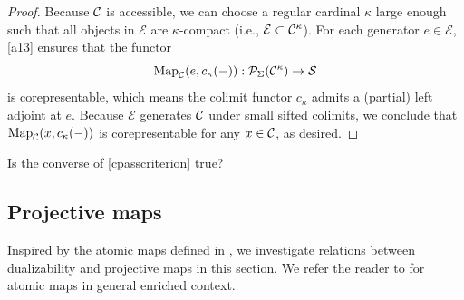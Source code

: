 \documentclass[a4paper,10pt, oneside]{amsart}
\begin{document}
	\begin{proof}
		Because $\mathcal{C}$ is accessible, we can choose a regular cardinal $\kappa$ large enough such that all objects in $\mathcal{E}$ are $\kappa$-compact (i.e., $\mathcal{E} \subset \mathcal{C}^\kappa$). For each generator $e \in \mathcal{E}$, \cref{a13} ensures that the functor $$\operatorname{Map}_\mathcal{C}(e, c_\kappa(-)): \mathcal{P}_\Sigma(\mathcal{C}^\kappa) \to \mathcal{S}$$ is corepresentable, which means the colimit functor $c_\kappa$ admits a (partial) left adjoint at $e$. Because $\mathcal{E}$ generates $\mathcal{C}$ under small sifted colimits, we conclude that $\operatorname{Map}_\mathcal{C}(x, c_\kappa(-))$ is corepresentable for any $x\in\mathcal{C}$, as desired.
	\end{proof}
	\begin{quest}
	Is the converse of	\cref{cpasscriterion} true?
	\end{quest}

		\subsection{Projective maps}
Inspired by 
the atomic maps defined in \cite{ramzi2024locally}, we investigate relations between dualizability and projective maps in this section. We refer the reader to \cite[]{ramzi2024locally} for atomic maps in general enriched context.
\end{document}
